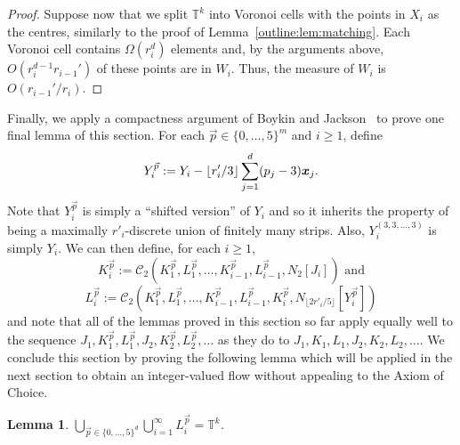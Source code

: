 \documentclass[12pt,a4paper]{amsart}
\numberwithin{equation}{section}
\newtheorem{lemma}[equation]{Lemma}
\theoremstyle{definition}
\begin{document}
\begin{proof}
Suppose now that we split $\mathbb{T}^k$ into Voronoi cells with the points in $X_i$ as the centres, similarly to the proof of Lemma~\ref{outline:lem:matching}. Each Voronoi cell contains $\Omega(r_i^d)$ elements and, by the arguments above, $O(r_i^{d-1}r_{i-1}')$ of these points are in $W_i$. Thus, the measure of $W_i$ is $O(r_{i-1}'/r_i)$. 
\end{proof}

Finally, we apply a compactness argument of Boykin and Jackson~\cite{BoykinJackson07} to prove one final lemma of this section. For each $\vec{p}\in \{0,\dots,5\}^m$ and $i\geq1$, define
\[Y_i^{\vec{p}}:=Y_i-\lfloor r'_i/3\rfloor\sum_{j=1}^d(p_j-3)\boldsymbol{x}_j.\]
Note that $Y_i^{\vec{p}}$ is simply a ``shifted version'' of $Y_i$ and so it inherits the property of being a maximally $r'_i$-discrete union of finitely many strips. Also, $Y_i^{(3,3,\dots,3)}$ is simply $Y_i$. We can then define, for each $i\geq1$,
\[K_i^{\vec{p}}:=\mathcal{C}_2(K_1^{\vec{p}},L_1^{\vec{p}},\dots,K_{i-1}^{\vec{p}},L_{i-1}^{\vec{p}},N_2[J_i])\text{ and}\]
\[L_i^{\vec{p}}:=\mathcal{C}_2(K_1^{\vec{p}},L_1^{\vec{p}},\dots,K_{i-1}^{\vec{p}},L_{i-1}^{\vec{p}},K_i^{\vec{p}},N_{\lfloor 2r'_i/5\rfloor}[Y_i^{\vec{p}}])\]
and note that all of the lemmas proved in this section so far apply equally well to the sequence $J_1,K_1^{\vec{p}},L_1^{\vec{p}},J_2,K_2^{\vec{p}},L_2^{\vec{p}},\dots$ as they do to $J_1,K_1,L_1,J_2,K_2,L_2,\dots$.
We conclude this section by proving the following lemma which will be applied in the next section to obtain an integer-valued flow without appealing to the Axiom of Choice.

\begin{lemma}
\label{lem:Licover}
$\bigcup_{\vec{p}\in\{0,\dots,5\}^d}\bigcup_{i=1}^\infty L_i^{\vec{p}}=\mathbb{T}^k$.
\end{lemma}
\end{document}
